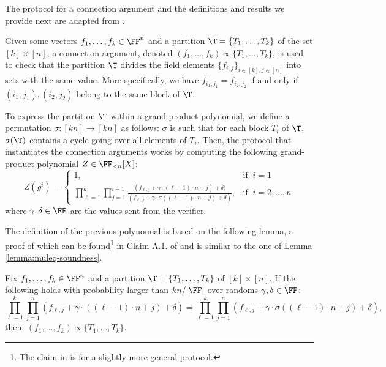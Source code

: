 The protocol for a connection argument and the definitions and results we provide next are adapted from \cite{EPRINT:GabWilCio19}.

Given some vectors $f_1,\dots,f_k \in \FF^n$ and a partition $\T = \{T_1,\dots,T_k\}$ of the set $[k] \times [n]$, a connection argument, denoted $(f_1,\dots,f_k) \propto \{T_1,\dots,T_k\}$, is used to check that the partition $\T$ divides the field elements $\{f_{i,j}\}_{i\in[k],j\in[n]}$ into sets with the same value. More specifically, we have $f_{i_1,j_1} = f_{i_2,j_2}$ if and only if $(i_1,j_1),(i_2,j_2)$ belong to the same block of $\T$. 

To express the partition $\T$ within a grand-product polynomial, we define a permutation $\sigma\colon [kn] \to [kn]$ as follows: $\sigma$ is such that for each block $T_i$ of $\T$, $\sigma(\T)$ contains a cycle going over all elements of $T_i$. Then, the protocol that instantiates the connection arguments works by computing the following grand-product polynomial $Z \in \FF_{<n}[X]$:
\[
  Z(g^i) = 
  \begin{cases} 
  1, & \text{if }~ i=1 \\ 
  \displaystyle\prod_{\ell=1}^{k}\prod_{j=1}^{i-1} \frac{(f_{\ell,j} + \gamma \cdot (\ell-1)\cdot n +j) + \delta)}{(f_{\ell,j} + \gamma \cdot \sigma((\ell-1)\cdot n +j) + \delta)}, & \text{if }~ i = 2, \dots, n
  \end{cases} 
\]
where $\gamma,\delta \in \FF$ are the values sent from the verifier. 


The definition of the previous polynomial is based on the following lemma, a proof of which can be found\footnote{The claim in \cite{EPRINT:GabWilCio19} is for a slightly more general protocol.} in Claim A.1. of \cite{EPRINT:GabWilCio19} and is similar to the one of Lemma \ref{lemma:muleq-soundness}.
\begin{lemma}\label{lemma:connection-soundness}
Fix $f_1,\dots,f_k \in \FF^n$ and a partition $\T = \{T_1,\dots,T_k\}$ of $[k] \times [n]$. If the following holds with probability larger than $kn/|\FF|$ over randoms $\gamma, \delta \in \FF$:
\[
\prod_{\ell=1}^k \prod_{j=1}^n (f_{\ell,j} + \gamma \cdot ((\ell-1)\cdot n + j) + \delta) = \prod_{\ell=1}^k \prod_{j=1}^n (f_{\ell,j} + \gamma \cdot \sigma((\ell-1)\cdot n + j) + \delta),
\]
then, $(f_1,\dots,f_k) \propto \{T_1,\dots,T_k\}$.
\end{lemma}

